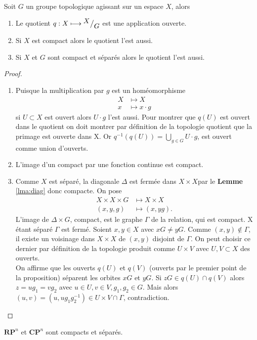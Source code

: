 \documentclass[main.tex]{subfiles}
\begin{document}
	\begin{prop}
		Soit $G$ un groupe topologique agissant sur un espace $X$, alors
		\begin{enumerate}
			\item Le quotient $q : X \longmapsto {^{\textstyle X}\big/_{\textstyle G}}$ est une application ouverte.
			\item Si $X$ est compact alors le quotient l'est aussi.
			\item Si $X$ et $G$ sont compact et séparés alors le quotient l'est aussi.
		\end{enumerate}
		\begin{proof}
			\begin{enumerate}
				\item Puisque la multiplication par $g$ est un homéomorphisme 
					 \begin{align*}
						 X &\longmapsto X \\
						 x &\longmapsto x\cdot g
					\end{align*}
					si $U \subset X$ est ouvert alors $U \cdot g$ l'est aussi. Pour montrer que $q(U)$ est ouvert dans le quotient on doit montrer par définition de la topologie quotient que la primage est ouverte dans X. Or  $q^{-1}(q(U)) = \bigcup_{g\in G}U\cdot g$, est ouvert comme union d'ouverts.
				\item L'image d'un compact par une fonction continue est compact.
				\item Comme $X$ est séparé, la diagonale $\Delta$ est fermée dans $X \times X$par le \textbf{Lemme} \ref{lma:diag} donc compacte. On pose
					\begin{align*}
						X \times X \times G &\longmapsto X \times X \\
						(x,y,g) &\longmapsto (x,yg)
					.\end{align*}
					L'image de $\Delta \times G$, compact, est le graphe $\Gamma$ de la relation, qui est compact. X étant séparé $\Gamma$ est fermé. Soient  $x,y \in X$ avec $xG \neq yG$. Comme  $(x,y) \not\in \Gamma$, il existe un voisinage dans $X\times X$ de $(x,y)$ disjoint de  $\Gamma$. On peut choisir ce dernier par définition de la topologie produit comme $U\times V$ avec $U,V \subset X$ des ouverts.  \\
					On affirme que les ouverts $q(U)$ et  $q(V)$ (ouverts par le premier point de la proposition) séparent les orbites  $xG$ et $yG$. Si  $zG \in q(U)\cap q(V)$ alors $z = ug_1 = vg_2$ avec $u\in U,v \in V, g_1,g_2\in G$. Mais alors $(u,v) = (u,ug_1g^{-1}_2) \in U\times V \cap \Gamma$, contradiction.
			\end{enumerate}
		\end{proof}
	\end{prop}
	\begin{example}
		$\mathbf{RP}^n$ et $\mathbf{CP}^n$ sont compacts et séparés.
	\end{example}
\end{document}

